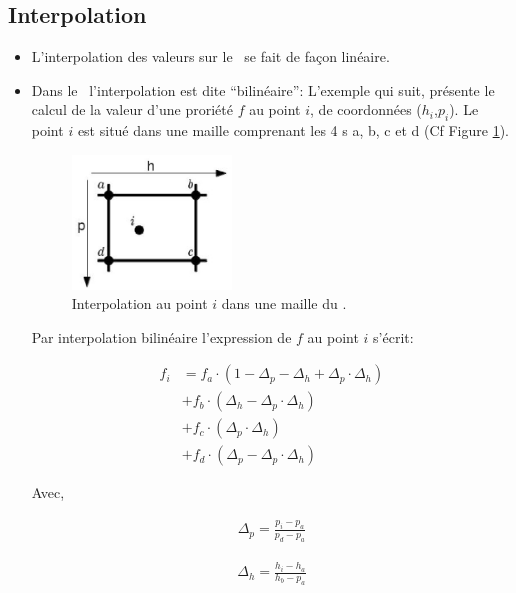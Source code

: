     \subsection{Interpolation}
    \begin{itemize}
      \item[\textbullet] L'interpolation des valeurs sur le \sgp\ se fait de façon linéaire.
      \item[\textbullet] Dans le \pph\ l'interpolation est dite ``bilinéaire'':
       \smallbreak\vspace{0.3cm}
       L'exemple qui suit, présente le calcul de la valeur d'une proriété $f$ au point $i$, de coordonnées ($h_i$,$p_i$). 
       Le point $i$ est situé dans une maille comprenant les 4 \n s a, b, c et d (Cf Figure \ref{schinter}).
       \begin{figure}[H]
	 \center
	 \includegraphics[width=0.4\textwidth]{schema_inter.eps}
	 \caption{Interpolation au point $i$ dans une maille du \pph.}\label{schinter}
       \end{figure}
       
       Par interpolation bilinéaire l'expression de $f$ au point $i$ s'écrit:
       
       \begin{align}
       \label{intereq}
       f_i &=  f_a\cdot(1 - \Delta_p - \Delta_h + \Delta_p\cdot\Delta_h)\\
           &+ f_b\cdot(\Delta_h -  \Delta_p\cdot\Delta_h)\nonumber\\
	   &+ f_c\cdot(\Delta_p\cdot\Delta_h)\nonumber\\
	   &+ f_d\cdot(\Delta_p - \Delta_p\cdot\Delta_h)\nonumber
       \end{align}
       


       Avec,\\
      \begin{minipage}{0.49\linewidth}
      \begin{align}
	\label{deltp}
	\Delta_p = \frac{p_i - p_a}{p_d - p_a}
      \end{align}
      \end{minipage}
      \begin{minipage}{0.49\linewidth}
      \begin{align}
	\label{delth}
	\Delta_h = \frac{h_i - h_a}{h_b - p_a}
      \end{align}
      \end{minipage}


\end{itemize}
